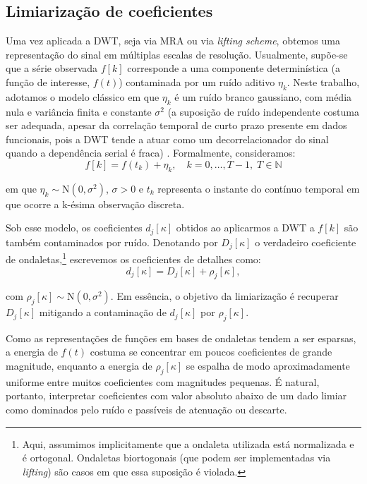 \subsection{Limiarização de coeficientes}\label{sec-limiarizacao}
Uma vez aplicada a DWT, seja via MRA ou via \emph{lifting scheme}, obtemos uma representação do sinal em múltiplas escalas de resolução. 
Usualmente, supõe-se que a série observada \(f[k]\) corresponde a uma componente determinística (a função de interesse, \(f(t)\)) contaminada por um ruído aditivo \(\eta_k\). 
Neste trabalho, adotamos o modelo clássico em que \(\eta_k\) é um ruído branco gaussiano, com média nula e variância finita e constante \(\sigma^{2}\) (a suposição de ruído independente costuma ser adequada, apesar da correlação temporal de curto prazo presente em dados funcionais, pois a DWT tende a atuar como um decorrelacionador do sinal quando a dependência serial é fraca) \cite{morettin_wavelets_2017}. 
Formalmente, consideramos:
\begin{equation}
    f[k] = f(t_k) + \eta_k, \quad k = 0, \dots, T-1,\; T \in \mathbb{N}
    \label{eq:thresholding-model}
\end{equation}

\noindent em que \(\eta_k \sim \mathrm{N}(0, \sigma^{2})\), \(\sigma > 0\) e \(t_k\) representa o instante do contínuo temporal em que ocorre a k-ésima observação discreta. 


Sob esse modelo, os coeficientes \(d_{j}[\kappa]\) obtidos ao aplicarmos a DWT a \(f[k]\) são também contaminados por ruído. 
Denotando por \(D_j[\kappa]\) o verdadeiro coeficiente de ondaletas,\footnote{Aqui, assumimos implicitamente que a ondaleta utilizada está normalizada e é ortogonal. Ondaletas biortogonais (que podem ser implementadas via \emph{lifting}) são casos em que essa suposição é violada.} escrevemos os coeficientes de detalhes como:
\begin{equation}
    d_j[\kappa] = D_j[\kappa] + \rho_j[\kappa],
    \label{eq:thresholding-details}
\end{equation}

\noindent com \(\rho_j[\kappa] \sim \mathrm{N}(0, \sigma^{2})\). Em essência, o objetivo da limiarização é recuperar \(D_j[\kappa]\) mitigando a contaminação de \(d_j[\kappa]\) por \(\rho_j[\kappa]\). 


Como as representações de funções em bases de ondaletas tendem a ser esparsas, a energia de \(f(t)\) costuma se concentrar em poucos coeficientes de grande magnitude, enquanto a energia de \(\rho_j[\kappa]\) se espalha de modo aproximadamente uniforme entre muitos coeficientes com magnitudes pequenas. 
É natural, portanto, interpretar coeficientes com valor absoluto abaixo de um dado limiar como dominados pelo ruído e passíveis de atenuação ou descarte.

